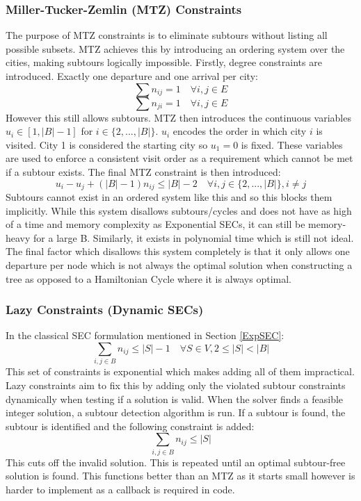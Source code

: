 \subsubsection{Miller-Tucker-Zemlin (MTZ) Constraints}\label{MTZ}
The purpose of MTZ constraints is to eliminate subtours without listing all possible subsets. MTZ achieves this by introducing an ordering system over the cities, making subtours logically impossible. \citep{MTZ_Constraints}\newline
Firstly, degree constraints are introduced. Exactly one departure and one arrival per city:
\[
\sum n_{ij} = 1 \quad\forall i,j\in E
\]
\[
\sum n_{ji} = 1 \quad\forall i,j\in E
\]
However this still allows subtours.\newline
MTZ then introduces the continuous variables $u_i \in [1, |B| - 1]$ for $i \in \{2,...,|B|\}$. $u_i$ encodes the order in which city $i$ is visited. City 1 is considered the starting city so $u_1=0$ is fixed. These variables are used to enforce a consistent visit order as a requirement which cannot be met if a subtour exists. The final MTZ constraint is then introduced:
\[
u_i-u_j+(|B|-1)n_{ij}\leq |B|-2 \quad\forall i,j\in \{2,...,|B|\}, i\neq j
\]
Subtours cannot exist in an ordered system like this and so this blocks them implicitly.\newline
While this system disallows subtours/cycles and does not have as high of a time and memory complexity as Exponential SECs, it can still be memory-heavy for a large B. Similarly, it exists in polynomial time which is still not ideal. The final factor which disallows this system completely is that it only allows one departure per node which is not always the optimal solution when constructing a tree as opposed to a Hamiltonian Cycle where it is always optimal.

\subsubsection{Lazy Constraints (Dynamic SECs)}\label{Lazy Constraints}
In the classical SEC formulation mentioned in Section \ref{ExpSEC}:
\[
\sum_{i,j\in B}n_{ij}\leq |S| - 1\quad\forall S\in V, 2\leq|S|<|B|
\]
This set of constraints is exponential which makes adding all of them impractical. Lazy constraints aim to fix this by adding only the violated subtour constraints dynamically when testing if a solution is valid. When the solver finds a feasible integer solution, a subtour detection algorithm is run. If a subtour is found, the subtour is identified and the following constraint is added:
\[
\sum_{i,j\in B}n_{ij}\le |S|
\]
This cuts off the invalid solution. This is repeated until an optimal subtour-free solution is found. This functions better than an MTZ as it starts small however is harder to implement as a callback is required in code. \citep{Pferschy_2016}



